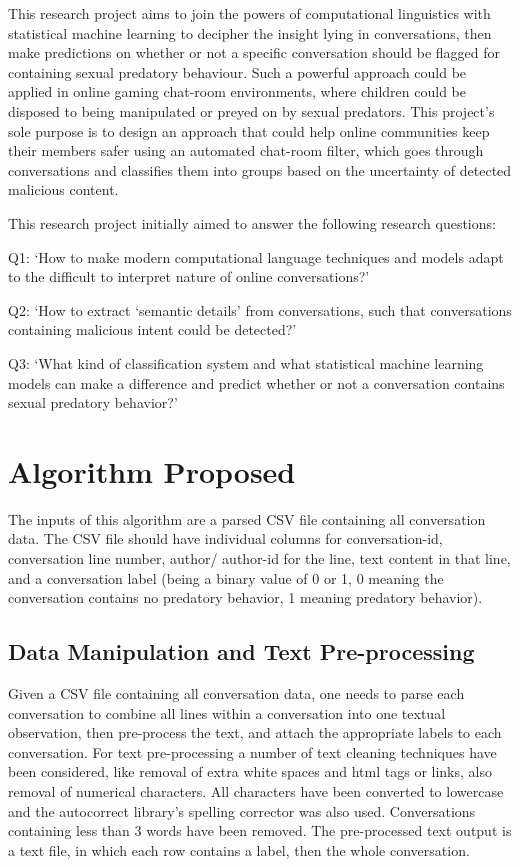 \documentclass[11pt]{article}
\begin{document}
\indent This research project aims to join the powers of computational linguistics with statistical machine learning to decipher the insight lying in conversations, then make predictions on whether or not a specific conversation should be flagged for containing sexual predatory behaviour. Such a powerful approach could be applied in online gaming chat-room environments, where children could be disposed to being manipulated or preyed on by sexual predators. This project's sole purpose is to design an approach that could help online communities keep their members safer using an automated chat-room filter, which goes through conversations and classifies them into groups based on the uncertainty of detected malicious content.

\indent This research project initially aimed to answer the following research questions:

Q1: ‘How to make modern computational language techniques and models adapt to the difficult to interpret nature of online conversations?’

Q2: ‘How to extract ‘semantic details’ from conversations, such that conversations containing malicious intent could be detected?’

Q3: ‘What kind of classification system and what statistical machine learning models can make a difference and predict whether or not a conversation contains sexual predatory behavior?’

\section{Algorithm Proposed}
The inputs of this algorithm are a parsed CSV file containing all conversation data. The CSV file should have individual columns for conversation-id, conversation line number, author/ author-id for the line, text content in that line, and a conversation label (being a binary value of 0 or 1, 0 meaning the conversation contains no predatory behavior, 1 meaning predatory behavior).

\subsection{Data Manipulation and Text Pre-processing}
Given a CSV file containing all conversation data, one needs to parse each conversation to combine all lines within a conversation into one textual observation, then pre-process the text, and attach the appropriate labels to each conversation. For text pre-processing a number of text cleaning techniques have been considered, like removal of extra white spaces and html tags or links, also removal of numerical characters. All characters have been converted to lowercase and the autocorrect \cite{mccallum_2016} library's spelling corrector was also used. Conversations containing less than 3 words have been removed. The pre-processed text output is a text file, in which each row contains a label, then the whole conversation.
\end{document}
